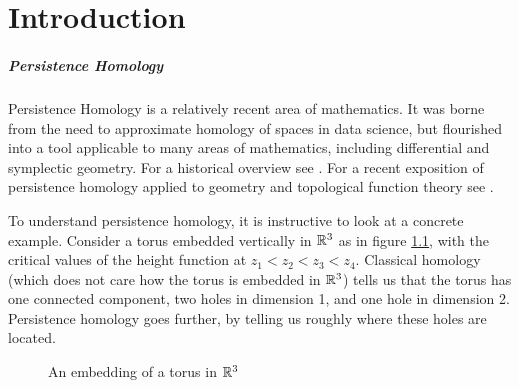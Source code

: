 
\chapter{Introduction}

\paragraph{Persistence Homology}
Persistence Homology is a relatively recent area of mathematics. It was borne from the need to approximate homology of spaces in data science, but flourished into a tool applicable to many areas of mathematics, including differential and symplectic geometry. For a historical overview see \cite{historypersistence}. For a recent exposition of persistence homology applied to geometry and topological function theory see \cite{polterovich}.

To understand persistence homology, it is instructive to look at a concrete example. Consider a torus embedded vertically in $\mathbb{R}^3$ as in figure \ref{fig:torus1}, with the critical values of the height function at 
$z_1 < z_2 < z_3 < z_4$. Classical homology (which does not care how the torus is embedded in $\mathbb{R}^3$) tells us that the torus has one connected component, two holes in dimension 1, and one hole in dimension 2. Persistence homology goes further, by telling us roughly where these holes are located.

\begin{figure}
\centering
{}
\caption{An embedding of a torus in $\mathbb{R}^3$}\label{fig:torus1}
\end{figure}

